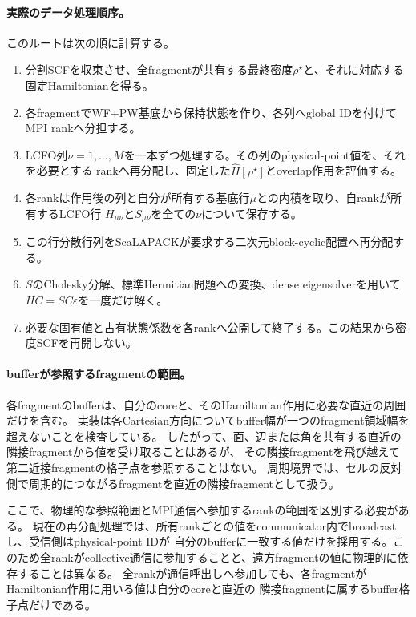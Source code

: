 \documentclass[11pt,a4paper]{article}
\begin{document}
\paragraph{実際のデータ処理順序。}
このルートは次の順に計算する。
\begin{enumerate}
\item 分割SCFを収束させ、全fragmentが共有する最終密度$\rho^\star$と、それに対応する固定Hamiltonianを得る。
\item 各fragmentでWF+PW基底から保持状態を作り、各列へglobal IDを付けてMPI rankへ分担する。
\item LCFO列$\nu=1,\ldots,M$を一本ずつ処理する。その列のphysical-point値を、それを必要とする
rankへ再分配し、固定した$\hat H[\rho^\star]$とoverlap作用を評価する。
\item 各rankは作用後の列と自分が所有する基底行$\mu$との内積を取り、自rankが所有するLCFO行
$H_{\mu\nu}$と$S_{\mu\nu}$を全ての$\nu$について保存する。
\item この行分散行列をScaLAPACKが要求する二次元block-cyclic配置へ再分配する。
\item $S$のCholesky分解、標準Hermitian問題への変換、dense eigensolverを用いて
$HC=SC\varepsilon$を一度だけ解く。
\item 必要な固有値と占有状態係数を各rankへ公開して終了する。この結果から密度SCFを再開しない。
\end{enumerate}

\paragraph{bufferが参照するfragmentの範囲。}
各fragmentのbufferは、自分のcoreと、そのHamiltonian作用に必要な直近の周囲だけを含む。
実装は各Cartesian方向についてbuffer幅が一つのfragment領域幅を超えないことを検査している。
したがって、面、辺または角を共有する直近の隣接fragmentから値を受け取ることはあるが、
その隣接fragmentを飛び越えて第二近接fragmentの格子点を参照することはない。
周期境界では、セルの反対側で周期的につながるfragmentを直近の隣接fragmentとして扱う。

ここで、物理的な参照範囲とMPI通信へ参加するrankの範囲を区別する必要がある。
現在の再分配処理では、所有rankごとの値をcommunicator内でbroadcastし、受信側はphysical-point IDが
自分のbufferに一致する値だけを採用する。このため全rankがcollective通信に参加することと、遠方fragmentの値に物理的に依存することは異なる。
全rankが通信呼出しへ参加しても、各fragmentがHamiltonian作用に用いる値は自分のcoreと直近の
隣接fragmentに属するbuffer格子点だけである。
\end{document}
